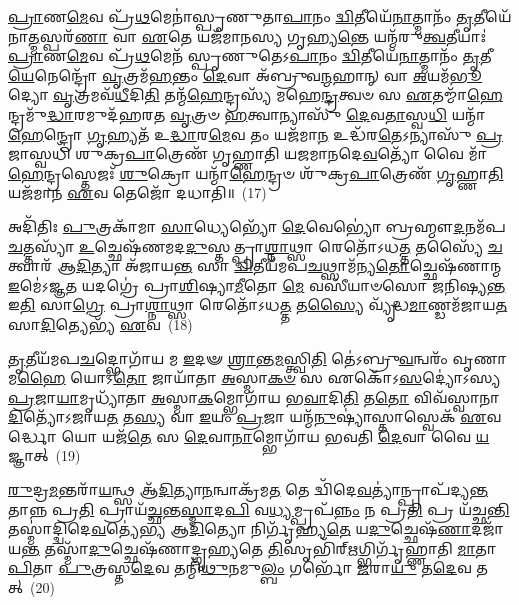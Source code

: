 \-\ul{𑌪𑍍𑌰𑌾}\-𑌣\-\ul{𑌮𑍇}\-𑌵 𑌪𑍍𑌰᳴\-\ul{𑌥}\-𑌮𑍇𑌨𑌾॑𑌸𑍍𑌪𑍃𑌣𑍁𑌤𑌾\-\ul{𑌪𑌾}\-𑌨𑌂 \ul{𑌦𑍍𑌵𑌿}\-𑌤𑍀𑌯𑍇᳴\-\ul{𑌨𑌾}\-𑌤𑍍𑌮𑌾𑌨𑌂᳴ \ul{𑌤𑍃}\-𑌤𑍀𑌯𑍇᳴𑌨𑌾\-\ul{𑌤𑍍𑌮}\-𑌸𑍍𑌪𑌰᳴\-\ul{𑌣𑌾} 𑌵𑌾 \ul{𑌏}\-𑌤𑍇 𑌯𑌜᳴𑌮𑌾𑌨𑌸𑍍𑌯 𑌗𑍃𑌹𑍍𑌯\-\ul{𑌨𑍍𑌤𑍇} 𑌯𑌨𑍍𑌮᳴𑌰𑍁\-\ul{𑌤𑍍𑌵}\-𑌤𑍀𑌯𑌾𑌃॑ \ul{𑌪𑍍𑌰𑌾}\-𑌣\-\ul{𑌮𑍇}\-𑌵 𑌪𑍍𑌰᳴\-\ul{𑌥}\-𑌮𑍇𑌨᳴ 𑌸𑍍𑌪𑍃𑌣𑍁𑌤𑍇\-𑌽\-\ul{𑌪𑌾}\-𑌨𑌂 \ul{𑌦𑍍𑌵𑌿}\-𑌤𑍀𑌯𑍇᳴\-\ul{𑌨𑌾}\-𑌤𑍍𑌮𑌾𑌨𑌂᳴ \ul{𑌤𑍃}\-𑌤𑍀\-\ul{𑌯𑍇}\-𑌨𑍇𑌨𑍍𑌦𑍍𑌰𑍋᳴ \ul{𑌵𑍃}\-𑌤𑍍𑌰𑌮᳴\-\ul{𑌹}\-𑌨𑍍𑌤𑌂 \ul{𑌦𑍇}\-𑌵𑌾 𑌅᳴𑌬𑍍𑌰𑍁𑌵\-\ul{𑌨𑍍𑌮}\-𑌹𑌾𑌨𑍍 𑌵𑌾 \ul{𑌅}\-𑌯𑌮᳴\-\ul{𑌭𑍂}\-𑌦𑍍𑌯𑍋 \ul{𑌵𑍃}\-𑌤𑍍𑌰𑌮𑌵᳴\-\ul{𑌧𑍀}\-𑌦𑌿\-\ul{𑌤𑌿} 𑌤𑌨𑍍𑌮᳴\-\ul{𑌹𑍇}\-𑌨𑍍𑌦𑍍𑌰𑌸𑍍𑌯᳴ 𑌮𑌹𑍇\-\ul{𑌨𑍍𑌦𑍍𑌰}\-𑌤𑍍𑌵𑍞 𑌸 \ul{𑌏}\-𑌤𑌮𑍍𑌮𑌾᳴\-\ul{𑌹𑍇}\-𑌨𑍍𑌦𑍍𑌰𑌮𑍁᳴\-\ul{𑌦𑍍𑌧𑌾}\-𑌰𑌮𑍁𑌦᳴𑌹𑌰𑌤 \ul{𑌵𑍃}\-𑌤𑍍𑌰𑍞 \ul{𑌹}\-𑌤𑍍𑌵𑌾𑌨𑍍𑌯𑌾𑌸𑍁᳴ \ul{𑌦𑍇}\-𑌵\-\ul{𑌤𑌾}\-𑌸𑍍𑌵\-\ul{𑌧𑌿} 𑌯𑌨𑍍𑌮𑌾᳴\-\ul{𑌹𑍇}\-𑌨𑍍𑌦𑍍𑌰𑍋 \ul{𑌗𑍃}\-𑌹𑍍𑌯𑌤᳴ 𑌉\-\ul{𑌦𑍍𑌧𑌾}\-𑌰\-\ul{𑌮𑍇}\-𑌵 𑌤𑌂 𑌯𑌜᳴𑌮𑌾\-\ul{𑌨} 𑌉𑌦𑍍𑌧᳴𑌰\-\ul{𑌤𑍇}\-\-𑌽𑌨𑍍𑌯𑌾𑌸𑍁᳴ \ul{𑌪𑍍𑌰}\-𑌜𑌾𑌸𑍍𑌵𑌧𑌿᳴ 𑌶𑍁𑌕𑍍𑌰\-\ul{𑌪𑌾}\-𑌤𑍍𑌰𑍇𑌣᳴ 𑌗𑍃𑌹𑍍𑌣𑌾𑌤𑌿 𑌯𑌜𑌮𑌾𑌨𑌦𑍇\-\ul{𑌵}\-𑌤𑍍𑌯𑍋᳴ 𑌵𑍈 𑌮𑌾᳴\-\ul{𑌹𑍇}\-𑌨𑍍𑌦𑍍𑌰𑌸𑍍𑌤𑍇𑌜𑌃᳴ \ul{𑌶𑍁}\-𑌕𑍍𑌰𑍋 𑌯𑌨𑍍𑌮𑌾᳴\-\ul{𑌹𑍇}\-𑌨𑍍𑌦𑍍𑌰𑍞 𑌶𑍁᳴𑌕𑍍𑌰\-\ul{𑌪𑌾}\-𑌤𑍍𑌰𑍇𑌣᳴ \ul{𑌗𑍃}\-𑌹𑍍𑌣𑌾\-\ul{𑌤𑌿} 𑌯𑌜᳴𑌮𑌾𑌨 \ul{𑌏}\-𑌵 𑌤𑍇𑌜𑍋᳴ 𑌦𑌧𑌾𑌤𑌿॥~(17)

{\anuvakamend[{\-\ul{𑌪𑍍𑌰}\-\-\ul{𑌥}\-𑌮𑍇𑌨𑌾᳴𑌗𑍃𑌹𑍍𑌣𑍀𑌤 \ul{𑌦𑍇}\-𑌵𑌤𑌾॑\-\ul{𑌸𑍍𑌵}\-𑌷𑍍𑌟𑌾𑌵𑌿𑍞᳴𑌶𑌤𑌿𑌶𑍍𑌚}]}%

𑌅𑌦𑌿᳴𑌤𑌿𑌃 \ul{𑌪𑍁}\-𑌤𑍍𑌰𑌕𑌾᳴𑌮𑌾 \ul{𑌸𑌾}\-𑌧𑍍𑌯𑍇𑌭𑍍𑌯𑍋᳴ \ul{𑌦𑍇}\-𑌵𑍇𑌭𑍍𑌯𑍋॑ 𑌬𑍍𑌰𑌹𑍍𑌮𑍗\-\ul{𑌦}\-𑌨𑌮᳴𑌪\-\ul{𑌚}\-𑌤𑍍𑌤𑌸𑍍𑌯𑌾᳴ \ul{𑌉}\-𑌚𑍍𑌛𑍇𑌷᳴𑌣𑌮𑌦\-\ul{𑌦𑍁}\-𑌸𑍍𑌤𑌤𑍍𑌪𑍍𑌰𑌾\-\ul{𑌶𑍍𑌨𑌾}\-𑌥𑍍𑌸𑌾 𑌰𑍇𑌤𑍋᳴\-𑌽𑌧\-\ul{𑌤𑍍𑌤} 𑌤𑌸𑍍𑌯𑍈᳴ \ul{𑌚}\-𑌤𑍍𑌵𑌾𑌰᳴ 𑌆\-\ul{𑌦𑌿}\-𑌤𑍍𑌯𑌾 𑌅᳴𑌜𑌾𑌯\-\ul{𑌨𑍍𑌤} 𑌸𑌾 \ul{𑌦𑍍𑌵𑌿}\-𑌤𑍀𑌯᳴𑌮𑌪\-\ul{𑌚}\-𑌥𑍍𑌸𑌾𑌮᳴𑌨𑍍𑌯\-\ul{𑌤𑍋}\-𑌚𑍍𑌛𑍇𑌷᳴𑌣𑌾𑌨𑍍𑌮 \ul{𑌇}\-𑌮𑍇॑\-𑌽𑌜𑍍𑌞\-\ul{𑌤} 𑌯𑌦𑌗𑍍𑌰𑍇॑ 𑌪𑍍𑌰𑌾\-\ul{𑌶𑌿}\-𑌷𑍍𑌯𑌾\-\ul{𑌮𑍀}\-𑌤𑍋 \ul{𑌮𑍇} 𑌵𑌸𑍀᳴𑌯𑌾𑍞𑌸𑍋 𑌜𑌨𑌿𑌷𑍍𑌯\-\ul{𑌨𑍍𑌤} 𑌇\-\ul{𑌤𑌿} 𑌸𑌾\-\ul{𑌗𑍍𑌰𑍇} 𑌪𑍍𑌰𑌾\-\ul{𑌶𑍍𑌨𑌾}\-𑌥𑍍𑌸𑌾 𑌰𑍇𑌤𑍋᳴\-𑌽𑌧\-\ul{𑌤𑍍𑌤} 𑌤\-\ul{𑌸𑍍𑌯𑍈} 𑌵𑍍𑌯𑍃᳴𑌦𑍍𑌧\-\ul{𑌮𑌾}\-𑌣𑍍𑌡𑌮᳴𑌜𑌾𑌯\-\ul{𑌤} 𑌸𑌾\-\ul{𑌦𑌿}\-𑌤𑍍𑌯𑍇𑌭𑍍𑌯᳴ \ul{𑌏}\-𑌵~(18)

\-\ul{𑌤𑍃}\-𑌤𑍀𑌯᳴𑌮𑌪\-\ul{𑌚}\-𑌦𑍍𑌭𑍋𑌗𑌾᳴𑌯 𑌮 \ul{𑌇}\-𑌦𑍟 \ul{𑌶𑍍𑌰𑌾}\-𑌨𑍍𑌤\-\ul{𑌮}\-𑌸𑍍𑌤𑍍𑌵𑌿\-\ul{𑌤𑌿} 𑌤𑍇॑\-𑌽𑌬𑍍𑌰𑍁\-\ul{𑌵}\-𑌨𑍍𑌵𑌰𑌂᳴ 𑌵𑍃𑌣𑌾𑌮\-\ul{𑌹𑍈} 𑌯𑍋\-𑌽\-\ul{𑌤𑍋} 𑌜𑌾𑌯𑌾᳴𑌤𑌾 \ul{𑌅}\-𑌸𑍍𑌮𑌾\-\ul{𑌕}\-\-\ul{𑍞} 𑌸 𑌏𑌕𑍋᳴\-𑌽\-\ul{𑌸}\-𑌦𑍍𑌯𑍋॑\-𑌽𑌸𑍍𑌯 \ul{𑌪𑍍𑌰}\-𑌜𑌾\-\ul{𑌯𑌾}\-𑌮𑍃𑌧𑍍𑌯𑌾᳴𑌤𑌾 \ul{𑌅}\-𑌸𑍍𑌮𑌾\-\ul{𑌕}\-𑌮𑍍𑌭𑍋𑌗𑌾᳴𑌯 𑌭\-\ul{𑌵𑌾}\-𑌦𑌿\-\ul{𑌤𑌿} 𑌤\-\ul{𑌤𑍋} 𑌵𑌿𑌵᳴𑌸𑍍𑌵𑌾𑌨𑌾\-\ul{𑌦𑌿}\-𑌤𑍍𑌯𑍋᳴\-𑌽𑌜𑌾𑌯\-\ul{𑌤} 𑌤\-\ul{𑌸𑍍𑌯} 𑌵𑌾 \ul{𑌇}\-𑌯𑌂 \ul{𑌪𑍍𑌰}\-𑌜𑌾 𑌯𑌨𑍍𑌮᳴\-\ul{𑌨𑍁}\-𑌷𑍍𑌯𑌾॑𑌸𑍍𑌤𑌾𑌸𑍍𑌵𑍇𑌕᳴ \ul{𑌏}\-𑌵𑌰𑍍𑌦𑍍𑌧𑍋 𑌯𑍋 𑌯𑌜᳴\-\ul{𑌤𑍇} 𑌸 \ul{𑌦𑍇}\-𑌵𑌾\-\ul{𑌨𑌾}\-𑌮𑍍𑌭𑍋𑌗𑌾᳴𑌯 𑌭𑌵𑌤𑌿 \ul{𑌦𑍇}\-𑌵𑌾 𑌵𑍈 \ul{𑌯}\-𑌜𑍍𑌞𑌾𑌤𑍍~(19)

\-\ul{𑌰𑍁}\-𑌦𑍍𑌰\-\ul{𑌮}\-𑌨𑍍𑌤𑌰𑌾᳴\-\ul{𑌯}\-𑌨𑍍𑌥𑍍𑌸 𑌆᳴\-\ul{𑌦𑌿}\-𑌤𑍍𑌯𑌾\-\ul{𑌨}\-𑌨𑍍𑌵𑌾𑌕𑍍𑌰᳴𑌮\-\ul{𑌤} 𑌤𑍇 𑌦𑍍𑌵𑌿᳴𑌦𑍇\-\ul{𑌵}\-𑌤𑍍𑌯𑌾॑𑌨𑍍𑌪𑍍𑌰𑌾𑌪᳴𑌦𑍍𑌯\-\ul{𑌨𑍍𑌤} 𑌤𑌾𑌨𑍍𑌨 𑌪𑍍𑌰\-\ul{𑌤𑌿} 𑌪𑍍𑌰𑌾𑌯᳴\-\ul{𑌚𑍍𑌛}\-𑌨𑍍𑌤\-\ul{𑌸𑍍𑌮𑌾}\-𑌦\-\ul{𑌪𑌿} 𑌵\-\ul{𑌧𑍍𑌯}\-𑌮𑍍𑌪𑍍𑌰𑌪᳴\-\ul{𑌨𑍍𑌨𑌂} 𑌨 𑌪𑍍𑌰\-\ul{𑌤𑌿} 𑌪𑍍𑌰 𑌯᳴𑌚𑍍𑌛\-\ul{𑌨𑍍𑌤𑌿} 𑌤𑌸𑍍𑌮𑌾॑𑌦𑍍𑌦𑍍𑌵𑌿𑌦𑍇\-\ul{𑌵}\-𑌤𑍍𑌯𑍇॑𑌭𑍍𑌯 𑌆\-\ul{𑌦𑌿}\-𑌤𑍍𑌯𑍋 𑌨𑌿𑌰𑍍𑌗𑍃᳴𑌹𑍍𑌯\-\ul{𑌤𑍇} 𑌯\-\ul{𑌦𑍁}\-𑌚𑍍𑌛𑍇𑌷᳴\-\ul{𑌣𑌾}\-𑌦𑌜𑌾᳴𑌯\-\ul{𑌨𑍍𑌤} 𑌤𑌸𑍍𑌮𑌾᳴\-\ul{𑌦𑍁}\-𑌚𑍍𑌛𑍇𑌷᳴𑌣𑌾𑌦𑍍𑌗𑍃𑌹𑍍𑌯𑌤𑍇 \ul{𑌤𑌿}\-𑌸𑍃𑌭𑌿᳴𑌰𑍍\mbox{}\-\ul{𑌋}\-𑌗𑍍𑌭𑌿𑌰𑍍𑌗𑍃᳴𑌹𑍍𑌣𑌾𑌤𑌿 \ul{𑌮𑌾}\-𑌤𑌾 \ul{𑌪𑌿}\-𑌤𑌾 \ul{𑌪𑍁}\-𑌤𑍍𑌰𑌸𑍍𑌤\-\ul{𑌦𑍇}\-𑌵 𑌤𑌨𑍍𑌮𑌿᳴\-\ul{𑌥𑍁}\-𑌨𑌮𑍁\-\ul{𑌲𑍍𑌬𑌂} 𑌗𑌰𑍍𑌭𑍋᳴ \ul{𑌜}\-𑌰𑌾\-\ul{𑌯𑍁} 𑌤\-\ul{𑌦𑍇}\-𑌵 𑌤𑌤𑍍~(20)

